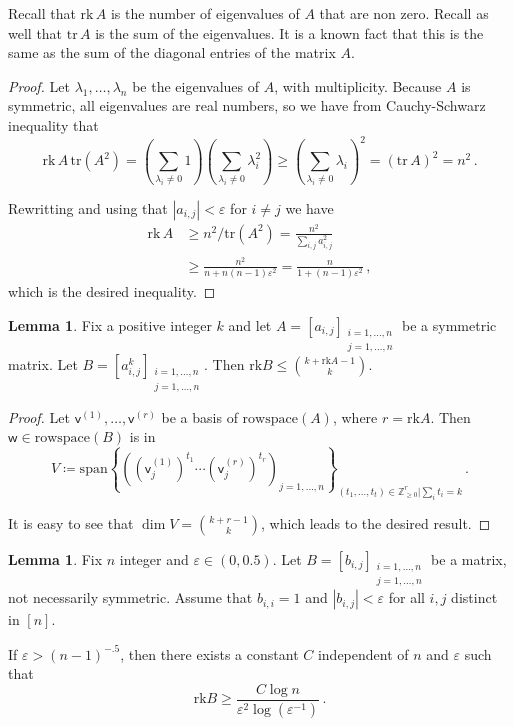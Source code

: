 \documentclass[12pt]{amsart}
\theoremstyle{definition}
\newtheorem{lm}[thm]{Lemma}
\newcommand{\Z}{\mathbb{Z}}
\newcommand{\vv}{\mathsf{v}}
\newcommand{\vw}{\mathsf{w}}
\newcommand{\spn}{\mathrm{span}}
\newcommand{\rk}{\mathrm{rk}}
\newcommand{\tr}{\mathrm{tr}}
\begin{document}
Recall that $\rk \, A$ is the number of eigenvalues of $A$ that are non zero.
Recall as well that $\tr \, A$ is the sum of the eigenvalues.
It is a known fact that this is the same as the sum of the diagonal entries of the matrix $A$.

\begin{proof}
Let $\lambda_1, \ldots, \lambda_n$ be the eigenvalues of $A$, with multiplicity.
Because $A$ is symmetric, all eigenvalues are real numbers, so we have from Cauchy-Schwarz inequality that
$$\rk \, A \,  \tr (A^2)= \left(\sum_{\lambda_i \neq 0} 1 \right)\left( \sum_{\lambda_i \neq 0} \lambda_i^2\right) \geq \left( \sum_{\lambda_i \neq 0} \lambda_i \right)^2 = (\tr\,  A)^2 = n^2 \, . $$

Rewritting and using that $|a_{i, j}| < \varepsilon$ for $i\neq j$ we have 
\begin{align*}
\rk \, A &\geq n^2/\tr (A^2) = \frac{n^2}{\sum_{i, j} a_{i, j}^2} \\
&\geq \frac{n^2}{n + n(n-1)\varepsilon^2} = \frac{n}{1 + (n-1)\varepsilon^2}\, ,
\end{align*}
which is the desired inequality.
\end{proof}

\begin{lm}\label{lm:JL_2}
Fix a positive integer $k$ and let $A = [a_{i, j}]_{\substack{i = 1, \ldots , n \\ j = 1, \ldots , n}}$ be a symmetric matrix.
Let $B = [a_{i, j}^k]_{\substack{i = 1, \ldots , n \\ j = 1, \ldots , n}}$.
Then $\rk B \leq \binom{k + \rk A - 1}{k}$.
\end{lm}

\begin{proof}
Let $\vv^{(1)}, \ldots, \vv^{(r)} $ be a basis of $\mathrm{rowspace}(A)$, where $r = \rk A$.
Then $\vw \in \mathrm{rowspace}(B)$ is in 
$$V \coloneqq \spn \left\{ \left((\vv_j^{(1)})^{t_1} \cdots (\vv_j^{(r)})^{t_r} \right)_{j = 1, \ldots, n}\right\}_{(t_1, \ldots , t_t) \in \Z_{\geq 0}^r | \sum_i t_i = k } \, .$$

It is easy to see that $\dim V = \binom{k + r - 1}{k}$, which leads to the desired result.
\end{proof}

\begin{lm}\label{lm:JL_3}
Fix $n$ integer and $\varepsilon \in (0, 0.5)$.
Let $B = [b_{i, j}]_{\substack{i = 1, \ldots , n \\ j = 1, \ldots , n}}$ be a matrix, not necessarily symmetric.
Assume that $b_{i, i} = 1$ and $|b_{i, j}| < \varepsilon $ for all $i, j$ distinct in $[n]$.

If $\varepsilon > (n-1)^{-.5}$, then there exists a constant $C$ independent of $n$ and $\varepsilon$ such that 
$$ \rk B \geq \frac{C \log n}{\varepsilon^2 \log (\varepsilon^{-1})}\, . $$
\end{lm}
\end{document}
